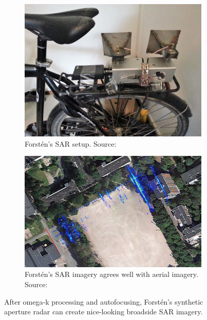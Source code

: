 \begin{figure}
    \begin{subfigure}[t]{0.43330076762\textwidth}
        \centering
        \includegraphics[max width=\linewidth]{gfx/pictures/forsten_1.jpg}
        \caption{Forstén's SAR setup. Source: \cite{Forsten2015}}
        \label{fig:forsten_1}
    \end{subfigure}%
    \hfill%
    \begin{subfigure}[t]{0.51669923238\textwidth}
        \centering
        \includegraphics[max width=\linewidth]{gfx/pictures/forsten_2.jpg}
        \caption{Forstén's SAR imagery agrees well with aerial imagery. Source: \cite{Forsten2015}}
        \label{fig:forsten_2}
    \end{subfigure}
    \caption{After omega-k processing and autofocusing, Forstén's synthetic aperture radar can create nice-looking broadside SAR imagery.}
    \label{fig:forsten}
\end{figure}


